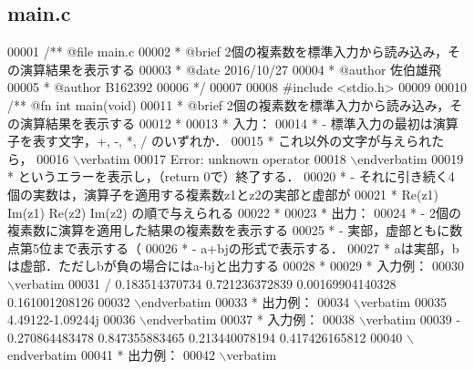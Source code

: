 \subsection{main.\-c}

\begin{DoxyCode}
00001 \textcolor{comment}{/**  @file main.c}
00002 \textcolor{comment}{ *   @brief  2個の複素数を標準入力から読み込み，その演算結果を表示する}
00003 \textcolor{comment}{ *   @date   2016/10/27}
00004 \textcolor{comment}{ *   @author 佐伯雄飛}
00005 \textcolor{comment}{ *   @author B162392}
00006 \textcolor{comment}{ */}
00007 
00008 \textcolor{preprocessor}{#include <stdio.h>}
00009 \textcolor{comment}{}
00010 \textcolor{comment}{/** @fn int main(void)}
00011 \textcolor{comment}{ *  @brief  2個の複素数を標準入力から読み込み，その演算結果を表示する}
00012 \textcolor{comment}{ *}
00013 \textcolor{comment}{ *  入力：}
00014 \textcolor{comment}{ *  - 標準入力の最初は演算子を表す文字，+, -, *, / のいずれか．}
00015 \textcolor{comment}{ *    これ以外の文字が与えられたら，}
00016 \textcolor{comment}{\(\backslash\)verbatim}
00017 \textcolor{comment}{Error: unknown operator}
00018 \textcolor{comment}{\(\backslash\)endverbatim}
00019 \textcolor{comment}{ *    というエラーを表示し，（return 0で）終了する．}
00020 \textcolor{comment}{ *  - それに引き続く4個の実数は，演算子を適用する複素数z1とz2の実部と虚部が}
00021 \textcolor{comment}{ *    Re(z1) Im(z1) Re(z2) Im(z2) の順で与えられる}
00022 \textcolor{comment}{ *}
00023 \textcolor{comment}{ *  出力：}
00024 \textcolor{comment}{ *  - 2個の複素数に演算を適用した結果の複素数を表示する}
00025 \textcolor{comment}{ *  - 実部，虚部ともに数点第5位まで表示する（%
00026 \textcolor{comment}{ *  - a+bjの形式で表示する．}
00027 \textcolor{comment}{ *    aは実部，bは虚部．ただしbが負の場合にはa-bjと出力する}
00028 \textcolor{comment}{ *}
00029 \textcolor{comment}{ *  入力例：}
00030 \textcolor{comment}{\(\backslash\)verbatim}
00031 \textcolor{comment}{/ 0.183514370734 0.721236372839 0.00169904140328 0.161001208126}
00032 \textcolor{comment}{\(\backslash\)endverbatim}
00033 \textcolor{comment}{  *  出力例：}
00034 \textcolor{comment}{\(\backslash\)verbatim}
00035 \textcolor{comment}{4.49122-1.09244j}
00036 \textcolor{comment}{\(\backslash\)endverbatim}
00037 \textcolor{comment}{  *  入力例：}
00038 \textcolor{comment}{\(\backslash\)verbatim}
00039 \textcolor{comment}{- 0.270864483478 0.847355883465 0.213440078194 0.417426165812}
00040 \textcolor{comment}{\(\backslash\)endverbatim}
00041 \textcolor{comment}{  *  出力例：}
00042 \textcolor{comment}{\(\backslash\)verbatim}
}
\end{DoxyCode}
